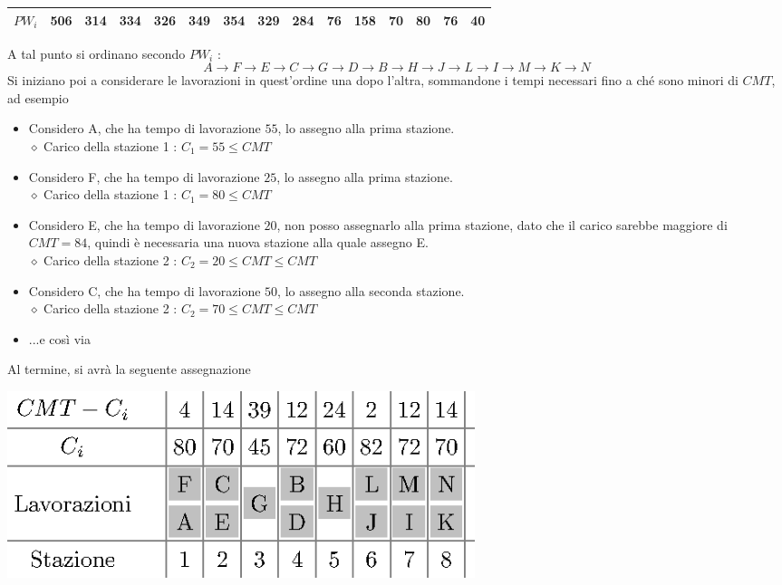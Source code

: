 \documentclass[10pt, letterpaper]{report}
\begin{document}
\begin{center}
\begin{tabular}{|c|c|c|c|c|c|c|c|c|c|c|c|c|c|c|}
        $PW_i$      & 506                                                       & 314                                                   & 334                                                   & 326                                                   & 349                                                      & 354                                                      & 329                                                  & 284    & 76 & 158                                               & 70 & 80 & 76 & 40 \\ \hline
        \end{tabular}
\end{center}
A tal punto si ordinano secondo $PW_i$ : $$A\rightarrow F \rightarrow  E \rightarrow  C \rightarrow  G 
\rightarrow D \rightarrow  B \rightarrow  H \rightarrow  J \rightarrow  L 
\rightarrow  I \rightarrow  M \rightarrow  K \rightarrow  N $$
Si iniziano poi a considerare le lavorazioni in quest'ordine una dopo l'altra, sommandone i tempi necessari fino 
a ché sono minori di $CMT$, ad esempio 
\begin{itemize}
    \item Considero A, che ha tempo di lavorazione $55$, lo assegno alla prima stazione. \\$\diamond $ Carico della stazione 1 : $C_1=55\le CMT$
    \item Considero F, che ha tempo di lavorazione $25$, lo assegno alla prima stazione. \\$\diamond $ Carico della stazione 1 : $C_1=80\le CMT$
    \item Considero E, che ha tempo di lavorazione $20$, non posso assegnarlo alla prima stazione, dato che il carico sarebbe 
    maggiore di $CMT=84$, quindi è necessaria una nuova stazione alla quale assegno E. \\$\diamond $ Carico della stazione 2 : $C_2=20\le CMT\le CMT$
    \item Considero C, che ha tempo di lavorazione $50$, lo assegno alla seconda stazione. \\$\diamond $ Carico della stazione 2 : $C_2=70\le CMT\le CMT$
    \item ...e così via
\end{itemize}
Al termine, si avrà la seguente assegnazione\begin{center}
    \includegraphics[width=0.6\textwidth ]{images/bilanciamentoLineaEs.eps}
\end{center}
\end{document}
